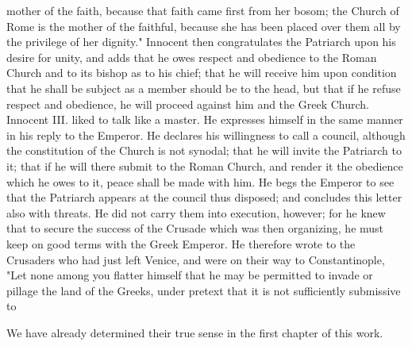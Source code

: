 mother of the faith, because that faith came first from her bosom; the Church of Rome is the mother of the faithful, because she has been placed over them all by the privilege of her dignity." Innocent then congratulates the Patriarch upon his desire for unity, and adds that he owes respect and obedience to the Roman Church and to its bishop as to his chief; that he will receive him upon condition that he shall be subject as a member should be to the head, but that if he refuse respect and obedience, he will proceed against him and the Greek Church. Innocent III. liked to talk like a master. He expresses himself in the same manner in his reply to the Emperor. He declares his willingness to call a council, although the constitution of the Church is not synodal; that he will invite the Patriarch to it; that if he will there submit to the Roman Church, and render it the obedience which he owes to it, peace shall be made with him. He begs the Emperor to see that the Patriarch appears at the council thus disposed; and concludes this letter also with threats. He did not carry them into execution, however; for he knew that to secure the success of the Crusade which was then organizing, he must keep on good terms with the Greek Emperor. He therefore wrote to the Crusaders who had just left Venice, and were on their way to Constantinople, "Let none among you flatter himself that he may be permitted to invade or pillage the land of the Greeks, under pretext that it is not sufficiently submissive to

We have already determined their true sense in the first chapter of this work.

